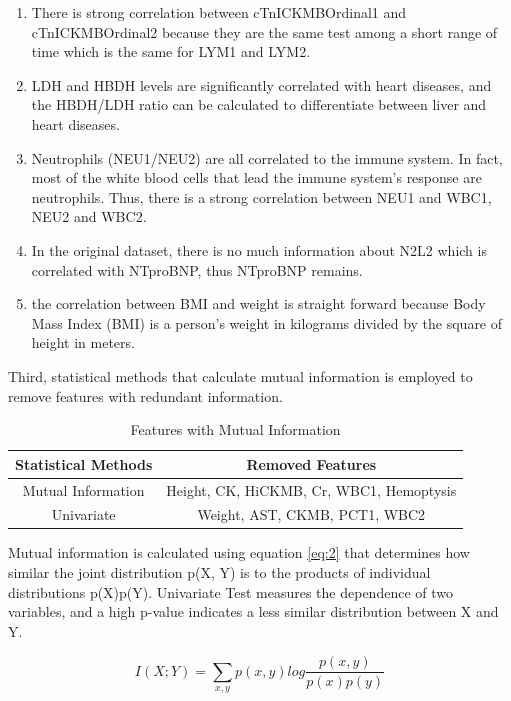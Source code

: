 \begin{enumerate}  
\item There is strong correlation between cTnICKMBOrdinal1 and cTnICKMBOrdinal2 because they are the same test among a short range of time which is the same for LYM1 and LYM2.
\item LDH and HBDH levels are significantly correlated with heart diseases, and the HBDH/LDH ratio can be calculated to differentiate between liver and heart diseases.
\item Neutrophils (NEU1/NEU2) are all correlated to the immune system. In fact, most of the white blood cells that lead the immune system’s response are neutrophils. Thus, there is a strong correlation between NEU1 and WBC1, NEU2 and WBC2.
\item In the original dataset, there is no much information about N2L2 which is correlated with NTproBNP, thus NTproBNP remains.
\item the correlation between BMI and weight is straight forward because Body Mass Index (BMI) is a person’s weight in kilograms divided by the square of height in meters.
\end{enumerate}

Third, statistical methods that calculate mutual information is employed to remove features with redundant information.

\begin{table}[H]
\centering
\caption{Features with Mutual Information}
\begin{tabular}{@{}cc@{}}
\toprule
Statistical Methods & Removed Features \\ \midrule
Mutual Information & Height, CK, HiCKMB, Cr, WBC1, Hemoptysis      \\
Univariate & Weight, AST, CKMB, PCT1, WBC2        \\  \bottomrule
\end{tabular}
\end{table}

Mutual information is calculated using equation \ref{eq:2} that determines how similar the joint distribution p(X, Y) is to the products of individual distributions p(X)p(Y). Univariate Test measures the dependence of two variables, and a high p-value indicates a less similar distribution between X and Y. 

\begin{equation}
    I(X;Y)=\sum_{x,y}p(x, y)log\frac{p(x,y)}{p(x)p(y)} \label{eq:2}
\end{equation}

